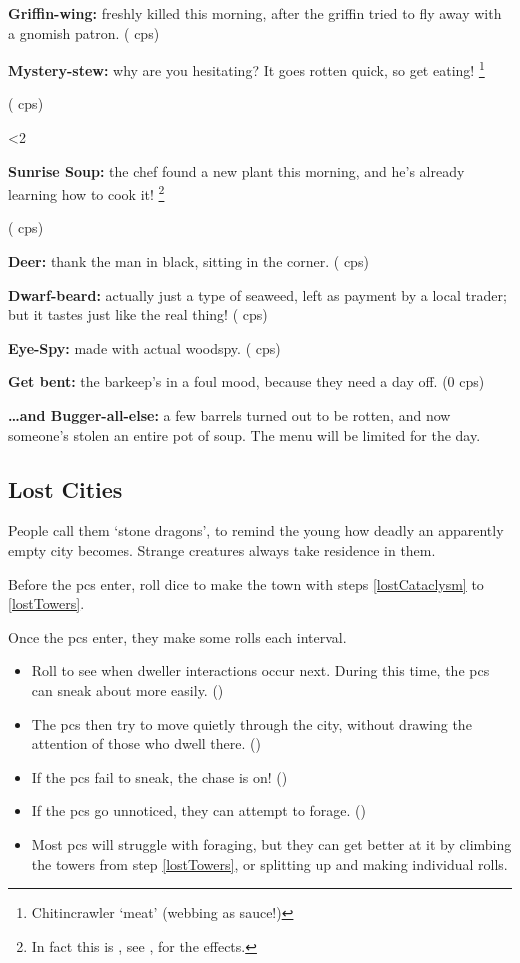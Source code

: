 \begin{multicols}{2}
\newcommand\menuItem[3][(\arabic{r12} \glspl{cp})]{%
  \randomdozen%
  \randomthree%
  \randomfourB%
  \ifodd\value{enumi}
    \randomthreeC%
    \randomfour%
  \fi
  \item
  \textbf{#2:}
  #3
  #1
}

\begin{dlist}
  \menuItem{Griffin-wing}{freshly killed this morning, after the griffin tried to fly away with a gnomish patron.}
  \menuItem{Mystery-stew}{why are you hesitating?
  It goes rotten quick, so get eating!
  \footnote{Chitincrawler `meat' (webbing as sauce!)}
  }
    \ifnum\value{r4}<2
      \newcommand\morningSoup{uproot}
    \else
      \newcommand\morningSoup{marching_mushroom}
    \fi
    \menuItem{Sunrise Soup}{the chef found a new plant this morning, and he's already learning how to cook it!
    \footnote{In fact this is \nameref{\morningSoup}, see \autopageref{\morningSoup}, for the effects.}
    }
  \menuItem{Deer}{thank the man in black, sitting in the corner.}
  \ifodd\value{r4}
    \menuItem{Dwarf-beard}{actually just a type of seaweed, left as payment by a local trader; but it tastes just like the real thing!}
  \else
    \menuItem{Eye-Spy}{made with actual woodspy.}
  \fi
  \ifodd\value{r3}
    \menuItem[(0 \glspl{cp})]{Get bent}{the barkeep's in a foul mood, because they need a day off.}
  \else
    \menuItem[]{\ldots and Bugger-all-else}{a few barrels turned out to be rotten, and now someone's stolen an entire pot of soup.
    The menu will be limited for the day.}
  \fi
\end{dlist}

\subsection{Lost Cities}
\label{lostCities}

People call them `stone dragons', to remind the young how deadly an apparently empty city becomes.
Strange creatures always take residence in them.

Before the \glspl{pc} enter, roll dice to make the town with steps \ref{lostCataclysm} to \ref{lostTowers}.

Once the \glspl{pc} enter, they make some rolls each \gls{interval}.

\begin{itemize}
  \item
  Roll to see when dweller interactions occur next.
  During this time, the \glspl{pc} can sneak about more easily.
  ()
  \item
  The \glspl{pc} then try to move quietly through the city, without drawing the attention of those who dwell there.
  ()
  \item
  If the \glspl{pc} fail to sneak, the chase is on!
  ()
  \item
  If the \glspl{pc} go unnoticed, they can attempt to forage.
  ()
  \item
  Most \glspl{pc} will struggle with foraging, but they can get better at it by climbing the towers from step \ref{lostTowers}, or splitting up and making individual rolls.
\end{itemize}


\end{multicols}
